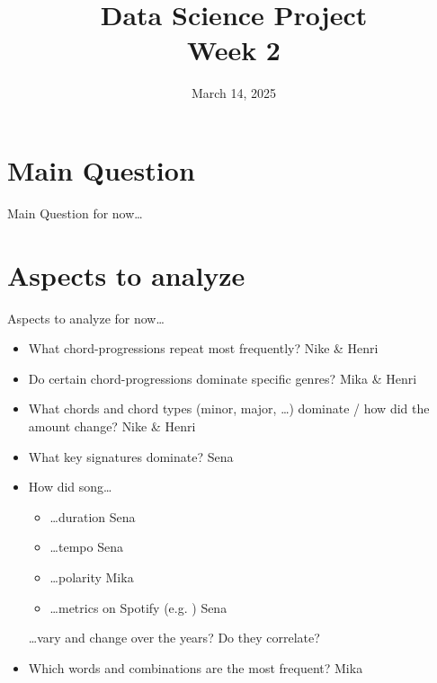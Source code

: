 

\title[Data Science Project: Week 2]{Data Science Project \\ \small Week 2}
\date{March 14, 2025}


    \maketitle
    
    \section{Main Question}
    \begin{frame}{Main Question {\tiny for now\dots}}
        \centering\huge
    \end{frame}
    
    \section{Aspects to analyze}
    \begin{frame}[allowframebreaks]{Aspects to analyze {\tiny for now\dots}}
        \begin{itemize}
            \item What chord-progressions repeat most frequently? \alert{Nike \& Henri}
            \item Do certain chord-progressions dominate specific genres? \alert{Mika \& Henri}
            \item What chords and chord types (minor, major, \dots) dominate / how did the amount change? \alert{Nike \& Henri}
            \item What key signatures dominate? \alert{Sena}
        \framebreak
            \item How did song\dots
                \begin{itemize}
                    \item \dots duration \alert{Sena}
                    \item \dots tempo \alert{Sena}
                    \item \dots polarity \alert{Mika}
                    \item \dots metrics on Spotify (e.g. \textit{}) \alert{Sena}
                \end{itemize}
                \dots vary and change over the years? Do they correlate?
            \item Which words and combinations are the most frequent? \alert{Mika}
        \end{itemize}
    \end{frame}

